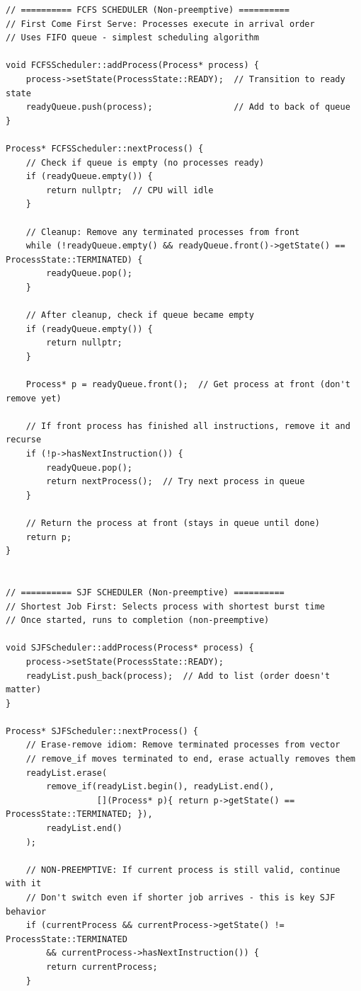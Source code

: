 \documentclass[a4paper,10pt,oneside]{article}
\begin{document}
\begin{multicols*}{\COLS}
\begin{lstlisting}
// ========== FCFS SCHEDULER (Non-preemptive) ==========
// First Come First Serve: Processes execute in arrival order
// Uses FIFO queue - simplest scheduling algorithm

void FCFSScheduler::addProcess(Process* process) {
    process->setState(ProcessState::READY);  // Transition to ready state
    readyQueue.push(process);                // Add to back of queue
}

Process* FCFSScheduler::nextProcess() {
    // Check if queue is empty (no processes ready)
    if (readyQueue.empty()) {
        return nullptr;  // CPU will idle
    }
    
    // Cleanup: Remove any terminated processes from front
    while (!readyQueue.empty() && readyQueue.front()->getState() == ProcessState::TERMINATED) {
        readyQueue.pop();
    }
    
    // After cleanup, check if queue became empty
    if (readyQueue.empty()) {
        return nullptr;
    }

    Process* p = readyQueue.front();  // Get process at front (don't remove yet)
    
    // If front process has finished all instructions, remove it and recurse
    if (!p->hasNextInstruction()) {
        readyQueue.pop();
        return nextProcess();  // Try next process in queue
    }
    
    // Return the process at front (stays in queue until done)
    return p;
}


// ========== SJF SCHEDULER (Non-preemptive) ==========
// Shortest Job First: Selects process with shortest burst time
// Once started, runs to completion (non-preemptive)

void SJFScheduler::addProcess(Process* process) {
    process->setState(ProcessState::READY);
    readyList.push_back(process);  // Add to list (order doesn't matter)
}

Process* SJFScheduler::nextProcess() {
    // Erase-remove idiom: Remove terminated processes from vector
    // remove_if moves terminated to end, erase actually removes them
    readyList.erase(
        remove_if(readyList.begin(), readyList.end(),
                  [](Process* p){ return p->getState() == ProcessState::TERMINATED; }),
        readyList.end()
    );

    // NON-PREEMPTIVE: If current process is still valid, continue with it
    // Don't switch even if shorter job arrives - this is key SJF behavior
    if (currentProcess && currentProcess->getState() != ProcessState::TERMINATED 
        && currentProcess->hasNextInstruction()) {
        return currentProcess;
    }


\end{lstlisting}
\end{multicols*}
\end{document}
